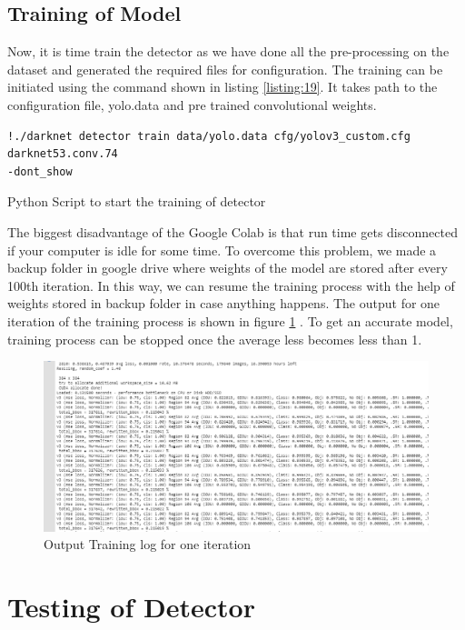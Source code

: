 \subsection{Training of Model}
Now, it is time train the detector as we have done all the pre-processing on the dataset and generated the required files for configuration. The training can be initiated using the command shown in listing \ref{listing:19}. It takes path to the configuration file, yolo.data and pre trained convolutional weights.
\begin{longlisting}
\begin{verbatim}
!./darknet detector train data/yolo.data cfg/yolov3_custom.cfg darknet53.conv.74 
-dont_show
\end{verbatim}
\caption{Python Script to start the training of detector}
\label{listing:19}
\end{longlisting}
The biggest disadvantage of the Google Colab is that run time gets disconnected if your computer is idle for some time. To overcome this problem, we made a backup folder in google drive  where weights of the model are stored after every 100th iteration. In this way, we can resume the training process with the help of weights stored in backup folder in case anything happens. The output for one iteration of the training process is shown in figure \ref{fig:5.8} . To get an accurate model, training process can be stopped once the average less becomes less than 1. 

\begin{figure}[H]
\centering
\captionsetup{justification = centering}
\includegraphics[scale= 0.6]{CHAPTERS/Chapter-5/images/5.8.PNG}
\caption{ Output Training log for one iteration } 
\label{fig:5.8}
\end{figure}

\section{Testing of Detector}
